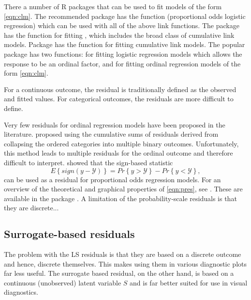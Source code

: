 There a number of R packages that can be used to fit models of the form \eqref{eqn:clm}. The recommended package  \citep{pkg-MASS} has the function  (proportional odds logistic regression) which can be used with all of the above link functions. The  \citep{pkg-VGAM} package has the  function for fitting , which includes the broad class of cumulative link models. Package  \citep{pkg-ordinal} has the  function for fitting cumulative link models. The popular  package \citep{pkg-rms} has two functions:  for fitting logistic regression models which allows the response to be an ordinal factor, and  for fitting ordinal regression models of the form \eqref{eqn:clm}.

For a continuous outcome, the residual is traditionally defined as the observed and fitted values. For categorical outcomes, the residuals are more difficult to define.

Very few residuals for ordinal regression models have been proposed in the literature. \citet{graphical-liu-2009} proposed using the cumulative sums of residuals derived from collapsing the ordered categories into multiple binary outcomes. Unfortunately, this method leads to multiple residuals for the ordinal outcome and therefore difficult to interpret. \citet{residuals-li-2012} showed that the sign-based statistic
\begin{equation}
\label{eqn:pres}
  E\left\{sign\left(y - \mathcal{Y}\right)\right\} = Pr\left\{y > \mathcal{Y}\right\} - Pr\left\{y < \mathcal{Y}\right\},
\end{equation}
can be used as a residual for proportional odds regression models. For an overview of the theoretical and graphical properties of \eqref{eqn:pres}, see \citet{residuals-liu-2017}. These are available in the  package \citep{pkg-PResiduals}. A limitation of the probability-scale residuals is that they are discrete...


\subsection{Surrogate-based residuals}

The problem with the LS residuals is that they are based on a discrete outcome and hence, discrete themselves. This makes using them in various diagnostic plots far less useful. The surrogate based residual, on the other hand, is based on a continuous (unobserved) latent variable $S$ and is far better suited for use in visual diagnostics.

